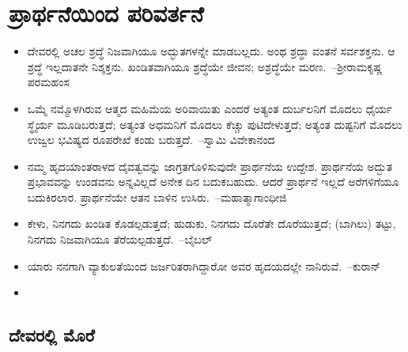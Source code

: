 
\chapter{ಪ್ರಾರ್ಥನೆಯಿಂದ ಪರಿವರ್ತನೆ}

\indentsecionsintoc

\begin{itemize}
\itemsep=8pt
\item ದೇವರಲ್ಲಿ ಅಚಲ ಶ್ರದ್ಧೆ ನಿಜವಾಗಿಯೂ ಅದ್ಭುತಗಳನ್ನೇ ಮಾಡಬಲ್ಲದು. ಅಂಥ ಶ್ರದ್ಧಾ ವಂತನೆ ಸರ್ವಶಕ್ತನು. ಆ ಶ್ರದ್ಧೆ ಇಲ್ಲದಾತನೇ ನಿಶ್ಶಕ್ತನು. ಖಂಡಿತವಾಗಿಯೂ ಶ್ರದ್ಧೆಯೇ ಜೀವನ; ಅಶ್ರದ್ಧೆಯೇ ಮರಣ.~\hfill–ಶ‍್ರೀರಾಮಕೃಷ್ಣ ಪರಮಹಂಸ

 \item ಒಮ್ಮೆ ನಮ್ಮೊಳಗಿರುವ ಆತ್ಮದ ಮಹಿಮೆಯ ಅರಿವಾಯಿತು ಎಂದರೆ ಅತ್ಯಂತ ದುರ್ಬಲನಿಗೆ ಮೊದಲು ಧೈರ್ಯ ಸ್ಥೈರ್ಯ ಮೂಡಿಬರುತ್ತದೆ; ಅತ್ಯಂತ ಅಧಮನಿಗೆ ಮೊದಲು ಕೆಚ್ಚು ಪುಟಿದೇಳುತ್ತದೆ; ಅತ್ಯಂತ ದುಷ್ಟನಿಗೆ ಮೊದಲು ಉಜ್ವಲ ಭವಿಷ್ಯದ ರೂಪರೇಖೆ ಕಂಡು ಬರುತ್ತದೆ.~\hfill–ಸ್ವಾಮಿ ವಿವೇಕಾನಂದ

 \item ನಮ್ಮ ಹೃದಯಾಂತರಾಳದ ದೈವತ್ವವನ್ನು ಜಾಗ್ರತಗೊಳಿಸುವುದೇ ಪ್ರಾರ್ಥನೆಯ ಉದ್ದೇಶ. ಪ್ರಾರ್ಥನೆಯ ಅದ್ಭುತ ಪ್ರಭಾವವನ್ನು ಉಂಡವನು ಅನ್ನವಿಲ್ಲದೆ ಅನೇಕ ದಿನ ಬದುಕಬಹುದು. ಆದರೆ ಪ್ರಾರ್ಥನೆ ಇಲ್ಲದೆ ಅರೆಗಳಿಗೆಯೂ ಬದುಕಿರಲಾರ. ಪ್ರಾರ್ಥನೆಯೇ ಆತನ ಬಾಳಿನ ಉಸಿರು.~\hfill–ಮಹಾತ್ಮಾಗಾಂಧೀಜಿ

 \item ಕೇಳು, ನಿನಗದು ಖಂಡಿತ ಕೊಡಲ್ಪಡುತ್ತದೆ; ಹುಡುಕು, ನಿನಗದು ದೊರೆತೇ ದೊರೆಯುತ್ತದೆ; (ಬಾಗಿಲು) ತಟ್ಟು, ನಿನಗದು ನಿಜವಾಗಿಯೂ ತೆರೆಯಲ್ಪಡುತ್ತದೆ.~\hfill–ಬೈಬಲ್​

 \item ಯಾರು ನನಗಾಗಿ ವ್ಯಾಕುಲತೆಯಿಂದ ಜರ್ಜರಿತರಾಗಿದ್ದಾರೋ ಅವರ ಹೃದಯದಲ್ಲೇ ನಾನಿರುವೆ.~\hfill–ಕುರಾನ್​

 \item 


\end{itemize}


\section*{ದೇವರಲ್ಲಿ ಮೊರೆ}


